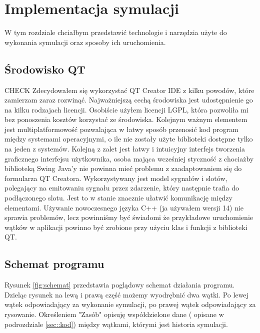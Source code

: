 \chapter{Implementacja symulacji}
\label{cha:implementacja}
W tym rozdziale chciałbym przedstawić technologie i narzędzia użyte do wykonania symulacji oraz sposoby ich uruchomienia.

\section{Środowisko QT}
\label{sec:qt}
{\color{red} CHECK}
Zdecydowałem się wykorzystać QT Creator IDE z kilku powodów, które zamierzam zaraz rozwinąć. Najważniejszą cechą środowiska jest udostępnienie go na kilku rodzajach licencji. Osobiście użyłem licencji LGPL, która pozwoliła mi bez ponoszenia kosztów korzystać ze środowiska. Kolejnym ważnym elementem jest multiplatformowość pozwalająca w łatwy sposób przenosić kod program między systemami operacyjnymi, o ile nie zostały użyte biblioteki dostępne tylko na jeden z systemów. Kolejną z zalet jest łatwy i intuicyjny interfejs tworzenia graficznego interfejsu użytkownika, osoba mająca wcześniej styczność z chociażby biblioteką Swing Java'y nie powinna mieć problemu z zaadaptowaniem się do  formularza QT Creatora. Wykorzystywany jest model sygnałów i slotów, polegający na emitowaniu sygnału przez zdarzenie, który następnie trafia do podłączonego slotu. Jest to w stanie znacznie ułatwić komunikację między elementami. Używanie nowoczesnego języka C++ (ja używałem wersji 14) nie sprawia problemów, lecz powinniśmy być świadomi że przykładowe uruchomienie wątków w aplikacji powinno być zrobione przy użyciu klas i funkcji z biblioteki QT.


\section{Schemat programu}
\label{sec::schemat}
Rysunek \ref{fig:schemat} przedstawia poglądowy schemat działania programu. Dzieląc rysunek na lewą i prawą część możemy wyodrębnić dwa wątki. Po lewej wątek odpowiadający za wykonanie symulacji, po prawej wątek odpowiadający za rysowanie. Określeniem "Zasób" opisuję współdzielone dane ( opisane w podrozdziale \ref{sec::kod}) między wątkami, którymi jest historia symulacji. 

